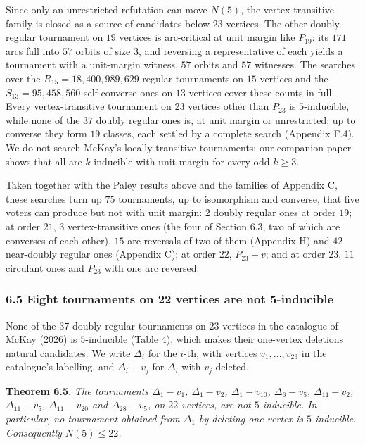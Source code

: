\documentclass[
]{article}
\newcounter{none} %
\begin{document}

Since only an unrestricted refutation can move \(N(5)\), the
vertex-transitive family is closed as a source of candidates below
\(23\) vertices. The other doubly regular tournament on \(19\) vertices
is arc-critical at unit margin like \(P_{19}\): its \(171\) arcs fall
into \(57\) orbits of size \(3\), and reversing a representative of each
yields a tournament with a unit-margin witness, \(57\) orbits and \(57\)
witnesses. The searches over the \(R_{15} = 18{,}400{,}989{,}629\)
regular tournaments on \(15\) vertices and the
\(S_{13} = 95{,}458{,}560\) self-converse ones on \(13\) vertices cover
these counts in full. Every vertex-transitive tournament on \(23\)
vertices other than \(P_{23}\) is \(5\)-inducible, while none of the
\(37\) doubly regular ones is, at unit margin or unrestricted; up to
converse they form \(19\) classes, each settled by a complete search
(Appendix F.4). We do not search McKay's locally transitive tournaments:
our companion paper shows that all are \(k\)-inducible with unit margin
for every odd \(k \ge 3\).

Taken together with the Paley results above and the families of Appendix
C, these searches turn up \(75\) tournaments, up to isomorphism and
converse, that five voters can produce but not with unit margin: \(2\)
doubly regular ones at order \(19\); at order \(21\), \(3\)
vertex-transitive ones (the four of Section 6.3, two of which are
converses of each other), \(15\) arc reversals of two of them (Appendix
H) and \(42\) near-doubly regular ones (Appendix C); at order \(22\),
\(P_{23} - v\); and at order \(23\), \(11\) circulant ones and
\(P_{23}\) with one arc reversed.

\subsubsection{6.5 Eight tournaments on 22 vertices are not
5-inducible}\label{eight-tournaments-on-22-vertices-are-not-5-inducible}

None of the \(37\) doubly regular tournaments on \(23\) vertices in the
catalogue of McKay (2026) is \(5\)-inducible (Table 4), which makes
their one-vertex deletions natural candidates. We write \(\Delta_i\) for
the \(i\)-th, with vertices \(v_1, \dots, v_{23}\) in the catalogue's
labelling, and \(\Delta_i - v_j\) for \(\Delta_i\) with \(v_j\) deleted.

\textbf{Theorem 6.5.} \emph{The tournaments \(\Delta_1 - v_{1}\),
\(\Delta_1 - v_{2}\), \(\Delta_1 - v_{10}\), \(\Delta_6 - v_{5}\),
\(\Delta_{11} - v_{2}\), \(\Delta_{11} - v_{5}\),
\(\Delta_{11} - v_{20}\) and \(\Delta_{28} - v_{5}\), on \(22\)
vertices, are not \(5\)-inducible. In particular, no tournament obtained
from \(\Delta_1\) by deleting one vertex is \(5\)-inducible.
Consequently \(N(5) \le 22\).}
\end{document}
